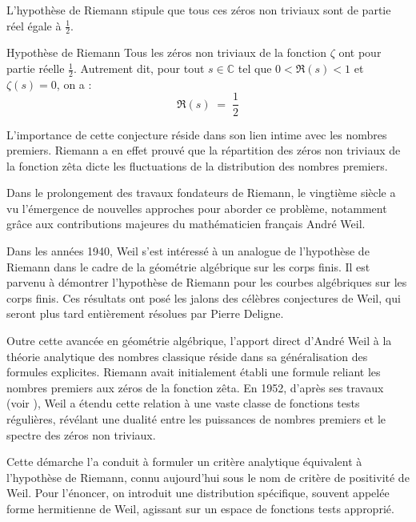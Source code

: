 \documentclass[Riemann_Hypothesis.tex]{subfiles}
\begin{document}
L'hypothèse de Riemann stipule que tous ces zéros non triviaux 
sont de partie réel égale à $\frac{1}{2}$.

\begin{theorem}[label=th:HypotheseRiemann]{Hypothèse de Riemann}
    Tous les zéros non triviaux de la fonction $\zeta$ ont pour partie réelle $\frac{1}{2}$. Autrement dit, pour tout $s \in \mathbb{C}$ tel que $0 < \Re(s) < 1$ et $\zeta(s) = 0$, on a :
    \begin{equation*}
        \Re(s) \;=\; \frac{1}{2}
    \end{equation*}
\end{theorem}

L'importance de cette conjecture réside dans son lien intime avec les nombres premiers. 
Riemann a en effet prouvé que la répartition des zéros non triviaux de la fonction zêta 
dicte les fluctuations de la distribution des nombres premiers. 

Dans le prolongement des travaux fondateurs de Riemann, le vingtième siècle a vu 
l'émergence de nouvelles approches pour aborder ce problème, notamment grâce aux 
contributions majeures du mathématicien français André Weil. 

Dans les années 1940, Weil s'est intéressé à un analogue de l'hypothèse de Riemann dans 
le cadre de la géométrie algébrique sur les corps finis. Il est parvenu à démontrer 
l'hypothèse de Riemann pour les courbes algébriques sur les corps finis. Ces résultats 
ont posé les jalons des célèbres conjectures de Weil, qui seront plus tard entièrement 
résolues par Pierre Deligne.

Outre cette avancée en géométrie algébrique, l'apport direct d'André Weil 
à la théorie analytique des nombres classique réside dans sa généralisation des formules 
explicites. Riemann avait initialement établi une formule reliant les nombres premiers 
aux zéros de la fonction zêta. En 1952, d'après ses 
travaux (voir \cite{weil1952_formules}), Weil a étendu 
cette relation à une vaste classe de fonctions tests régulières, 
révélant une dualité entre les puissances de nombres premiers 
et le spectre des zéros non triviaux.

Cette démarche l'a conduit à formuler un critère analytique équivalent 
à l'hypothèse de Riemann, connu aujourd'hui sous le nom de critère de 
positivité de Weil. Pour l'énoncer, on introduit une distribution spécifique, 
souvent appelée forme hermitienne de Weil, agissant sur un espace de fonctions 
tests approprié.
\end{document}
